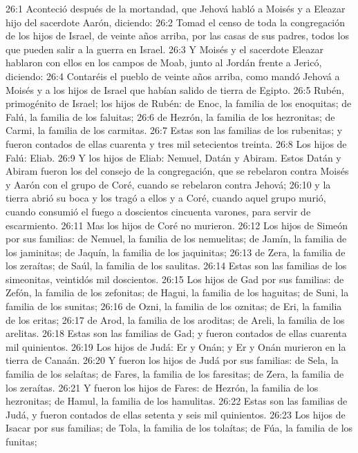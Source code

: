 26:1 Aconteció después de la mortandad, que Jehová habló a Moisés y a Eleazar hijo del sacerdote Aarón, diciendo:  
26:2 Tomad el censo de toda la congregación de los hijos de Israel, de veinte años arriba, por las casas de sus padres, todos los que pueden salir a la guerra en Israel.  
26:3 Y Moisés y el sacerdote Eleazar hablaron con ellos en los campos de Moab, junto al Jordán frente a Jericó, diciendo:  
26:4 Contaréis el pueblo de veinte años arriba, como mandó Jehová a Moisés y a los hijos de Israel que habían salido de tierra de Egipto.  
26:5 Rubén, primogénito de Israel; los hijos de Rubén: de Enoc, la familia de los enoquitas; de Falú, la familia de los faluitas;  
26:6 de Hezrón, la familia de los hezronitas; de Carmi, la familia de los carmitas.  
26:7 Estas son las familias de los rubenitas; y fueron contados de ellas cuarenta y tres mil setecientos treinta.  
26:8 Los hijos de Falú: Eliab.  
26:9 Y los hijos de Eliab: Nemuel, Datán y Abiram. Estos Datán y Abiram fueron los del consejo de la congregación, que se rebelaron contra Moisés y Aarón con el grupo de Coré, cuando se rebelaron contra Jehová;  
26:10 y la tierra abrió su boca y los tragó a ellos y a Coré, cuando aquel grupo murió, cuando consumió el fuego a doscientos cincuenta varones, para servir de escarmiento.  
26:11 Mas los hijos de Coré no murieron.  
26:12 Los hijos de Simeón por sus familias: de Nemuel, la familia de los nemuelitas; de Jamín, la familia de los jaminitas; de Jaquín, la familia de los jaquinitas;  
26:13 de Zera, la familia de los zeraítas; de Saúl, la familia de los saulitas.  
26:14 Estas son las familias de los simeonitas, veintidós mil doscientos.  
26:15 Los hijos de Gad por sus familias: de Zefón, la familia de los zefonitas; de Hagui, la familia de los haguitas; de Suni, la familia de los sunitas;  
26:16 de Ozni, la familia de los oznitas; de Eri, la familia de los eritas;  
26:17 de Arod, la familia de los aroditas; de Areli, la familia de los arelitas.  
26:18 Estas son las familias de Gad; y fueron contados de ellas cuarenta mil quinientos.  
26:19 Los hijos de Judá: Er y Onán; y Er y Onán murieron en la tierra de Canaán.  
26:20 Y fueron los hijos de Judá por sus familias: de Sela, la familia de los selaítas; de Fares, la familia de los faresitas; de Zera, la familia de los zeraítas.  
26:21 Y fueron los hijos de Fares: de Hezrón, la familia de los hezronitas; de Hamul, la familia de los hamulitas.  
26:22 Estas son las familias de Judá, y fueron contados de ellas setenta y seis mil quinientos.  
26:23 Los hijos de Isacar por sus familias; de Tola, la familia de los tolaítas; de Fúa, la familia de los funitas;  
